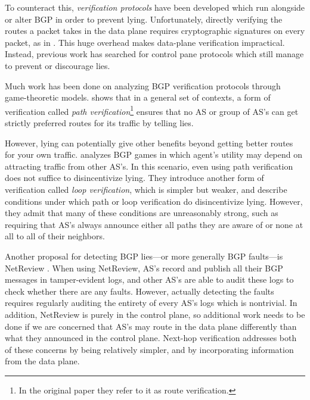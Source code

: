 \documentclass[10pt]{article}
\begin{document}
    To counteract this, \emph{verification protocols} have been developed which
    run alongside or alter BGP in order to prevent lying.
    Unfortunately, directly verifying the routes a packet takes in the data plane
    requires cryptographic signatures on every packet, as in \cite{DataPlane}.
    This huge overhead makes data-plane verification impractical.
    Instead, previous work has searched for control pane protocols
    which still manage to prevent or discourage lies.

    Much work has been done on analyzing BGP verification protocols
    through game-theoretic models.
    \cite{RoutingGames} shows that in a general set of contexts, a form of
    verification called \emph{path verification}\footnote{
      In the original
      paper they refer to it as route verification.}
    ensures that no AS or group of
    AS's can get strictly preferred routes for its traffic by telling lies.

    However, lying can potentially give other benefits beyond getting better
    routes for your own traffic.
    \cite{Attraction} analyzes BGP games in which agent's utility may depend
    on attracting traffic from other AS's.
    In this scenario, even using path verification does not suffice to
    disincentivize lying.
    They introduce another form of verification
    called \emph{loop verification}, which is simpler but weaker, and describe
    conditions under which path or loop verification do disincentivize lying.
    However, they admit that many of these conditions are unreasonably strong,
    such as requiring that AS's always announce either all paths they are aware
    of or none at all to all of their neighbors.
    
    Another proposal for detecting BGP lies---or more generally BGP faults---is NetReview \cite{NetReview}. When using NetReview, AS's record and publish all their BGP messages in tamper-evident logs, and other AS's are able to audit these logs to check whether there are any faults. However, actually detecting the faults requires regularly auditing the entirety of every AS's logs which is nontrivial. In addition, NetReview is purely in the control plane, so additional work needs to be done if we are concerned that AS's may route in the data plane differently than what they announced in the control plane. Next-hop verification addresses both of these concerns by being relatively simpler, and by incorporating information from the data plane.
\end{document}
